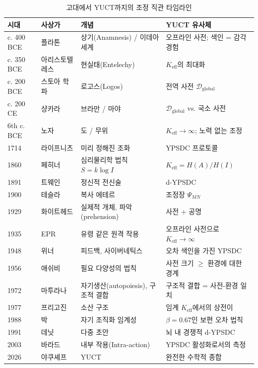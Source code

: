 \documentclass[12pt,a4paper]{article}
\begin{document}
	\begin{table}[htbp]
		\centering
		\caption{고대에서 YUCT까지의 조정 직관 타임라인}
		\label{tab:timeline}
		\small
		\begin{tabular}{p{1.2cm}p{3cm}p{4.5cm}p{4cm}}
			\toprule
			\textbf{시대} & \textbf{사상가} & \textbf{개념} & \textbf{YUCT 유사체} \\
			\midrule
			c. 400 BCE & 플라톤 & 상기(Anamnesis) / 이데아 세계 & 오프라인 사전; 색인 = 감각 경험 \\
			c. 350 BCE & 아리스토텔레스 & 현실태(Entelechy) & \(K_{\mathrm{eff}}\)의 최대화 \\
			c. 200 BCE & 스토아 학파 & 로고스(Logos) & 전역 사전 \(\mathcal{D}_{\text{global}}\) \\
			c. 200 CE & 샹카라 & 브라만 / 마야 & \(\mathcal{D}_{\text{global}}\) vs. 국소 사전 \\
			6th c. BCE & 노자 & 도 / 무위 & \(K_{\mathrm{eff}} \to \infty\); 노력 없는 조정 \\
			1714 & 라이프니츠 & 미리 정해진 조화 & YPSDC 프로토콜 \\
			1860 & 페히너 & 심리물리학 법칙 \(S = k \log I\) & \(K_{\mathrm{eff}} = H(A)/H(I)\) \\
			1891 & 트웨인 & 정신적 전신술 & d-YPSDC \\
			1900 & 테슬라 & 복사 에테르 & 조정장 \(\Psi_{MN}\) \\
			1929 & 화이트헤드 & 실제적 개체, 파악(prehension) & 사전 + 공명 \\
			1935 & EPR & 유령 같은 원격 작용 & 오프라인 사전으로 \(K_{\mathrm{eff}} \to \infty\) \\
			1948 & 위너 & 피드백, 사이버네틱스 & 오차 색인을 가진 YPSDC \\
			1956 & 애쉬비 & 필요 다양성의 법칙 & 사전 크기 \(\ge\) 환경에 대한 경계 \\
			1972 & 마투라나 & 자기생산(autopoiesis), 구조적 결합 & 구조적 결합 = 사전-환경 일치 \\
			1977 & 프리고진 & 소산 구조 & 임계 \(K_{\mathrm{eff}}\)에서의 상전이 \\
			1988 & 박 & 자기 조직화 임계성 & \(\beta = 0.67\)인 보편 오차 법칙 \\
			1991 & 데닛 & 다중 초안 & 뇌 내 경쟁적 d-YPSDC \\
			2003 & 바라드 & 내부 작용(Intra-action) & YPSDC 활성화로서의 측정 \\
			2026 & 야쿠셰프 & YUCT & 완전한 수학적 종합 \\
			\bottomrule
		\end{tabular}
	\end{table}
	
\end{document}
